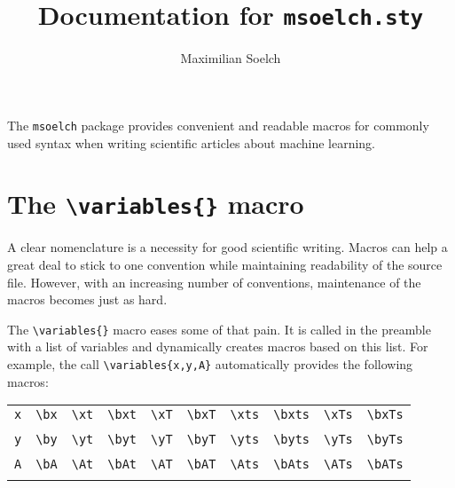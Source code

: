 \documentclass
[
twoside, %
]
{article}
\title{Documentation for \texttt{msoelch.sty}}
\author{Maximilian Soelch}
\begin{document}
\maketitle

The \texttt{msoelch} package provides convenient and readable macros for commonly used syntax when writing scientific articles about machine learning.

\section{The \texttt{\textbackslash variables\{\}} macro}
A clear nomenclature is a necessity for good scientific writing. Macros can help a great deal to stick to one convention while maintaining readability of the source file. However, with an increasing number of conventions, maintenance of the macros becomes just as hard.

The \texttt{\textbackslash variables\{\}} macro eases some of that pain. It is called in the preamble with a list of variables and dynamically creates macros based on this list. For example, the call \texttt{\textbackslash variables\{x,y,A\}} automatically provides the following macros:

\begin{table}[hb]
	\centering
	\begin{tabular}{cccccccccc}
		\texttt{x} & \texttt{\textbackslash bx}& \texttt{\textbackslash xt} & \texttt{\textbackslash bxt} &\texttt{\textbackslash xT} & \texttt{\textbackslash bxT} & \texttt{\textbackslash xts} & \texttt{\textbackslash bxts} & \texttt{\textbackslash xTs} & \texttt{\textbackslash bxTs}\\
					& \bx & \xt & \bxt & \xT & \bxT & \xts  & \bxts & \xTs & \bxTs\\
		\texttt{y} & \texttt{\textbackslash by}& \texttt{\textbackslash yt} & \texttt{\textbackslash byt} &\texttt{\textbackslash yT} & \texttt{\textbackslash byT} & \texttt{\textbackslash yts} & \texttt{\textbackslash byts} & \texttt{\textbackslash yTs} & \texttt{\textbackslash byTs}\\
		& \by & \yt & \byt & \yT & \byT & \yts  & \byts & \yTs & \byTs\\
		\texttt{A} & \texttt{\textbackslash bA}& \texttt{\textbackslash At} & \texttt{\textbackslash bAt} &\texttt{\textbackslash AT} & \texttt{\textbackslash bAT} & \texttt{\textbackslash Ats} & \texttt{\textbackslash bAts} & \texttt{\textbackslash ATs} & \texttt{\textbackslash bATs}\\
		& \bA & \At & \bAt & \AT & \bAT & \Ats  & \bAts & \ATs & \bATs
	\end{tabular}
\end{table}
\end{document}
